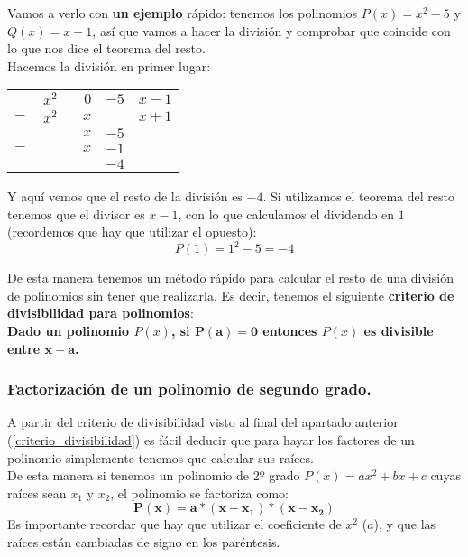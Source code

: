 \documentclass[a4paper,11pt,answers]{exam}
\begin{document}
Vamos a verlo con \textbf{un ejemplo} rápido: tenemos los polinomios $P(x) = x^2 - 5$ y $Q(x) = x-1$, así que vamos a hacer la división y comprobar que coincide con lo que nos dice el teorema del resto.\\
Hacemos la división en primer lugar:
\begin{center}
\begin{tabular}{rrrrl}
&$x^2$&$0$& \multicolumn{1}{r|}{$-5$} & $x-1$ \\ \cline{5-5} 
  $-\ $&$x^2$&$-x$& &$x +1$\\ \cline{2-3}
& &$x$&$-5$& \\
  $-\ $&&$x$&$-1$& \\ \cline{3-4}
  &&&$-4$& 
\end{tabular}
\end{center}
Y aquí vemos que el resto de la división es $-4$.
Si utilizamos el teorema del resto tenemos que el divisor es $x-1$, con lo que calculamos el dividendo en $1$ (recordemos que hay que utilizar el opuesto):
\[P(1) = 1^2 - 5 = -4\]

De esta manera tenemos un método rápido para calcular el resto de una división de polinomios sin tener que realizarla. Es decir, tenemos el siguiente \large{\textbf{criterio de divisibilidad para polinomios}}:\\

\textbf{Dado un polinomio $P(x)$, si $\boldsymbol{P(a) = 0}$ entonces $P(x)$ es divisible entre $\boldsymbol{x-a}$.}\label{criterio_divisibilidad}



\subsubsection{Factorización de un polinomio de segundo grado.}\label{factor_segundo_grado}
A partir del criterio de divisibilidad visto al final del apartado anterior (\ref{criterio_divisibilidad}) es fácil deducir que para hayar los factores de un polinomio simplemente tenemos que calcular sus raíces.\\
De esta manera si tenemos un polinomio de 2º grado $P(x) = ax^2 + bx +c$ cuyas raíces sean $x_1$ y $x_2$, el polinomio se factoriza como:
\[\boldsymbol{P(x) = a*(x-x_1)*(x-x_2)}\]
Es importante recordar que hay que utilizar el coeficiente de $x^2$ ($a$), y que las raíces están cambiadas de signo en los paréntesis.\\ 
\end{document}
